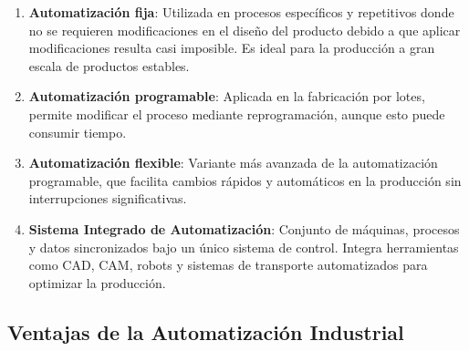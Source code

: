 \begin{enumerate}
    \item \textbf{Automatización fija}: Utilizada en procesos específicos y repetitivos donde no se requieren modificaciones en el diseño del producto debido a que aplicar modificaciones resulta casi imposible. Es ideal para la producción a gran escala de productos estables.
    \item \textbf{Automatización programable}: Aplicada en la fabricación por lotes, permite modificar el proceso mediante reprogramación, aunque esto puede consumir tiempo.
    \item \textbf{Automatización flexible}: Variante más avanzada de la automatización programable, que facilita cambios rápidos y automáticos en la producción sin interrupciones significativas.
    \item \textbf{Sistema Integrado de Automatización}: Conjunto de máquinas, procesos y datos sincronizados bajo un único sistema de control. Integra herramientas como CAD, CAM, robots y sistemas de transporte automatizados para optimizar la producción.
\end{enumerate}

\subsection{Ventajas de la Automatización Industrial}

